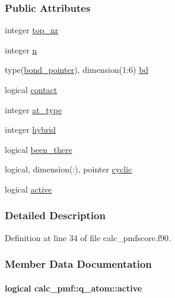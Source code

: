 \subsubsection*{Public Attributes}
\begin{DoxyCompactItemize}
\item 
integer \hyperlink{structcalc__pmf_1_1q__atom_aec4318350bbf3e202fd44c43652aaa83}{top\-\_\-nr}
\item 
integer \hyperlink{structcalc__pmf_1_1q__atom_a0ebcafc2c36be4d01f708362f29ce06d}{n}
\item 
type(\hyperlink{structcalc__pmf_1_1bond__pointer}{bond\-\_\-pointer}), dimension(1\-:6) \hyperlink{structcalc__pmf_1_1q__atom_a1339270eeede3b493cde60ac5b70abbe}{bd}
\item 
logical \hyperlink{structcalc__pmf_1_1q__atom_a65c37473a2d186c40e51de7b1e59576f}{contact}
\item 
integer \hyperlink{structcalc__pmf_1_1q__atom_ae214b397a75cb1ddbbc609afe6ccfb6f}{at\-\_\-type}
\item 
integer \hyperlink{structcalc__pmf_1_1q__atom_a36f1d4d20254ef57da10efc02b924d05}{hybrid}
\item 
logical \hyperlink{structcalc__pmf_1_1q__atom_a622d06b0bb3182cb78b0626be1c256d9}{been\-\_\-there}
\item 
logical, dimension(\-:), pointer \hyperlink{structcalc__pmf_1_1q__atom_a3d3b0b69d9b8803b8329fd43b31e9ba5}{cyclic}
\item 
logical \hyperlink{structcalc__pmf_1_1q__atom_a7a98975ba06df02b403374d9365035c1}{active}
\end{DoxyCompactItemize}


\subsubsection{Detailed Description}


Definition at line 34 of file calc\-\_\-pmfscore.\-f90.



\subsubsection{Member Data Documentation}
\hypertarget{structcalc__pmf_1_1q__atom_a7a98975ba06df02b403374d9365035c1}{
\paragraph[{active}]{\setlength{\rightskip}{0pt plus 5cm}logical calc\-\_\-pmf\-::q\-\_\-atom\-::active}}\label{structcalc__pmf_1_1q__atom_a7a98975ba06df02b403374d9365035c1}


